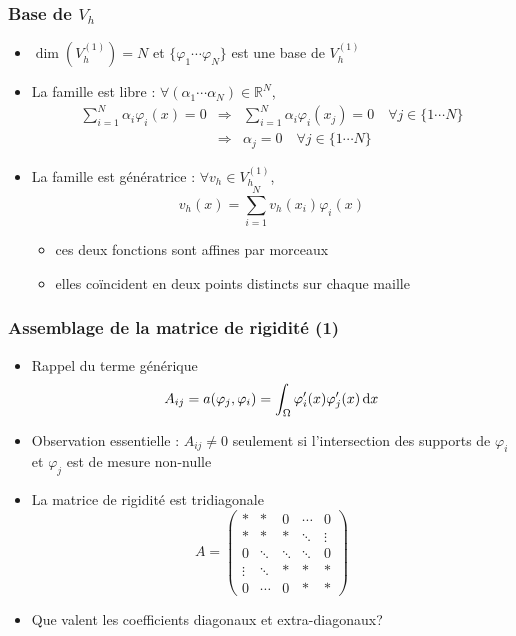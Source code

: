 \documentclass{beamer}
\def \de {{\rm d}}
\begin{document}
\begin{frame}
\frametitle{Base de $V_h$}
\begin{itemize}
\item $\dim(V_h^{(1)})=N$ et $\{\varphi_1 \cdots \varphi_N \}$ est une base de $V_h^{(1)}$

\item La famille est libre : $\forall (\alpha_1 \cdots \alpha_N ) \in \mathbb{R}^N$,
\[\begin{array}{lll}
\displaystyle \sum_{i=1}^N\alpha_i\varphi_i(x)=0&\Longrightarrow & \sum_{i=1}^N\alpha_i\varphi_i(x_j)=0\quad \forall j\in \{1\cdots N\}\\
&\Longrightarrow & \alpha_j=0\quad \forall j\in \{1\cdots N\}
\end{array}\]
\item  La famille est génératrice : $\forall v_h \in V_h^{(1)}$,
\[v_h(x)=\sum_{i=1}^Nv_h(x_i)\varphi_i(x)\]
\begin{itemize}
\item ces deux fonctions sont affines par morceaux
\item elles coïncident en deux points distincts sur chaque maille
\end{itemize}
\end{itemize}

\end{frame}

\begin{frame}
\frametitle{Assemblage de la matrice de rigidité (1)}
\begin{itemize}
\item Rappel du terme générique
\[A_{ij}=a(\varphi_j,\varphi_i)=\int_{\Omega}\varphi'_i(x)\varphi'_j(x)\,\de x\]
\item Observation essentielle : $A_{ij}\neq 0$ seulement si l'intersection des supports de $\varphi_i$ et $\varphi_j$ est de mesure non-nulle
\item La matrice de rigidité est tridiagonale
\[A=\left(\begin{array}{ccccc}
* & * & 0 &\cdots & 0 \\
* & * & *& \ddots & \vdots  \\
0 & \ddots  & \ddots & \ddots & 0 \\
\vdots & \ddots  & * & * & *  \\
0 & \cdots  & 0 & * & * 
\end{array}\right)\]
\item Que valent les coefficients diagonaux et extra-diagonaux?
\end{itemize}


\end{frame}
\end{document}
